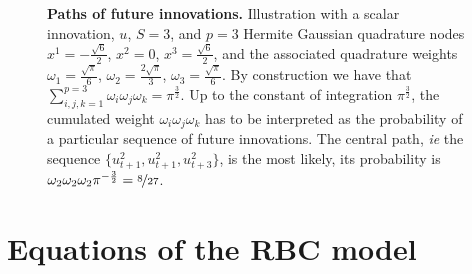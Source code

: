 \documentclass[a4paper,12pt]{amsart}
\begin{document}
\begin{figure}[H]
{\begin{tikzpicture}
      \end{tikzpicture}}
   \bigskip\bigskip
   \caption{\textbf{Paths of  future innovations.} Illustration  with a
   scalar  innovation,   $u$,  $S=3$,  and   $p=3$  Hermite  Gaussian
   quadrature      nodes      $x^1=-\frac{\sqrt{6}}{2}$,     $x^2=0$,
   $x^3=\frac{\sqrt{6}}{2}$,  and the  associated  quadrature weights
   $\omega_1      =      \frac{\sqrt{\pi}}{6}$,      $\omega_2      =
      \frac{2\sqrt{\pi}}{3}$,  $\omega_3  =  \frac{\sqrt{\pi}}{6}$.   By
   construction       we       have      that       $\sum_{i,j,k=1}^{p=3}
      \omega_i\omega_j\omega_k = \pi^{\frac{3}{2}}$.  Up to the constant
   of   integration   $\pi^{\frac{3}{2}}$,   the   cumulated   weight
   $\omega_i\omega_j\omega_k$   has   to   be  interpreted   as   the
   probability of  a particular  sequence of future  innovations. The
   central  path, \textit{ie} the sequence $\{u^2_{t+1},u^2_{t+1},u^2_{t+3}\}$,
   is      the     most      likely,      its     probability      is
   $\omega_2\omega_2\omega_2\pi^{-\frac{3}{2}}=\nicefrac{8}{27}$.}
\end{figure}

\newpage

\setcounter{equation}{0}
\renewcommand{\theequation}{\thesection.\arabic{equation}}


\section{Equations of the RBC model}\label{appendix:rbc}
\setcounter{equation}{0}
\end{document}
